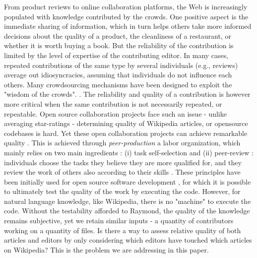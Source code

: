 From product reviews to online collaboration platforms, the Web is increasingly populated with knowledge contributed by the crowds. One positive aspect is the immediate sharing of information, which in turn helps others take more informed decisions about the quality of a product, the cleanliness of a restaurant, or whether it is worth buying a book. But the reliability of the contribution is limited by the level of expertise of the contributing editor. In many cases, repeated contributions of the same type by several individuals (e.g., reviews) average out idiosyncracies, assuming that individuals do not influence each others. 
Many crowdsourcing mechanisms have been designed to exploit the "wisdom of the crowds". \cite{https://en.wikipedia.org/wiki/The_Wisdom_of_Crowds}. The reliability and quality of a contribution is however more critical  when the same contribution is not necessarily repeated, or repeatable. Open source collaboration projects face such an issue - unlike averaging star-ratings - determining quality of Wikipedia articles, or opensource codebases is hard. Yet these open collaboration projects can achieve remarkable quality \cite{nature paper}. This is achieved through {\it peer-production} a labor organization, which mainly relies on two main ingredients : (i) task self-selection and (ii) peer-review : individuals choose the tasks they believe they are more qualified for, and they review the work of others also according to their skills \cite{benkler2002}. These principles have been initially used for open source software development \cite{raymond1999}, for which it is possible to ultimately test the quality of the work by executing the code. However, for natural language knowledge, like  Wikipedia, there is no "machine" to execute the code. Without the testability afforded to Raymond, the quality of the knowledge remains subjective, yet we retain similar inputs - a quantity of contributors working on a quantity of files.
Is there a way to assess relative quality of both articles and editors by only considering which editors have touched which articles on Wikipedia? This is the problem we are addressing in this paper.